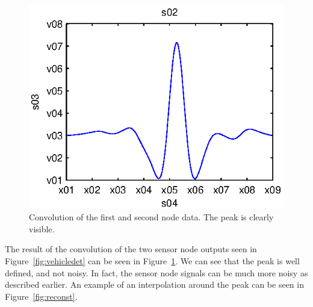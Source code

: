 \begin{subfigures}
\begin{figure}[!ht]
\begin{minipage}{0.45\linewidth}
   \includegraphics[width=\linewidth]{images/conv}
  \caption[Matched filter method. Convolution result.]{Convolution of the first and second node data. The peak is clearly visible.\\}
  \label{fig:conv}
  \end{minipage}
 \end{figure}
 \end{subfigures}
 
 The result of the convolution of the two sensor node outputs seen in Figure~\ref{fig:vehicledet} can be seen in Figure~\ref{fig:conv}. We can see that the peak is well defined, and not noisy. In fact, the sensor node signals can be much more noisy as described earlier. An example of an interpolation around the peak can be seen in Figure~\ref{fig:reconst}.
 
